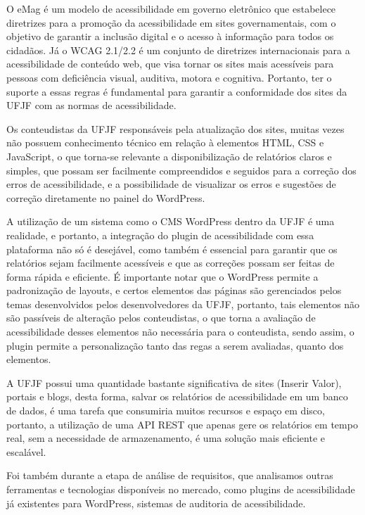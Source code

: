 \documentclass[article,12pt,oneside,a4paper,hyphens]{abntex2}
\begin{document}
O eMag é um modelo de acessibilidade em governo eletrônico que estabelece
diretrizes para a promoção da acessibilidade em sites governamentais, com o
objetivo de garantir a inclusão digital e o acesso à informação para todos os
cidadãos. Já o WCAG 2.1/2.2 é um conjunto de diretrizes internacionais para a
acessibilidade de conteúdo web, que visa tornar os sites mais acessíveis para
pessoas com deficiência visual, auditiva, motora e cognitiva. Portanto, ter o
suporte a essas regras é fundamental para garantir a conformidade dos sites da
UFJF com as normas de acessibilidade.

Os conteudistas da UFJF responsáveis pela atualização dos sites, muitas vezes não
possuem conhecimento técnico em relação à elementos HTML, CSS e JavaScript, o que
torna-se relevante a disponibilização de relatórios claros e simples, que possam
ser facilmente compreendidos e seguidos para a correção dos erros de acessibilidade,
e a possibilidade de visualizar os erros e sugestões de correção diretamente no
painel do WordPress.

A utilização de um sistema como o CMS WordPress dentro da UFJF é uma realidade, e
portanto, a integração do plugin de acessibilidade com essa plataforma não só
é desejável, como também é essencial para garantir que os relatórios sejam
facilmente acessíveis e que as correções possam ser feitas de forma rápida e
eficiente. É importante notar que o WordPress permite a padronização de layouts,
e certos elementos das páginas são gerenciados pelos temas desenvolvidos pelos
desenvolvedores da UFJF, portanto, tais elementos não são passíveis de alteração
pelos conteudistas, o que torna a avaliação de acessibilidade desses elementos
não necessária para o conteudista, sendo assim, o plugin permite a personalização
tanto das regas a serem avaliadas, quanto dos elementos.

A UFJF possui uma quantidade bastante significativa de sites (Inserir Valor), portais e blogs, desta
forma, salvar os relatórios de acessibilidade em um banco de dados, é uma tarefa que 
consumiria muitos recursos e espaço em disco, portanto, a utilização de uma API REST
que apenas gere os relatórios em tempo real, sem a necessidade de armazenamento, é 
uma solução mais eficiente e escalável.
 
Foi também durante a etapa de análise de requisitos, que analisamos 
outras ferramentas e tecnologias disponíveis no mercado, como plugins 
de acessibilidade já existentes para WordPress, sistemas de auditoria de acessibilidade.
\end{document}
